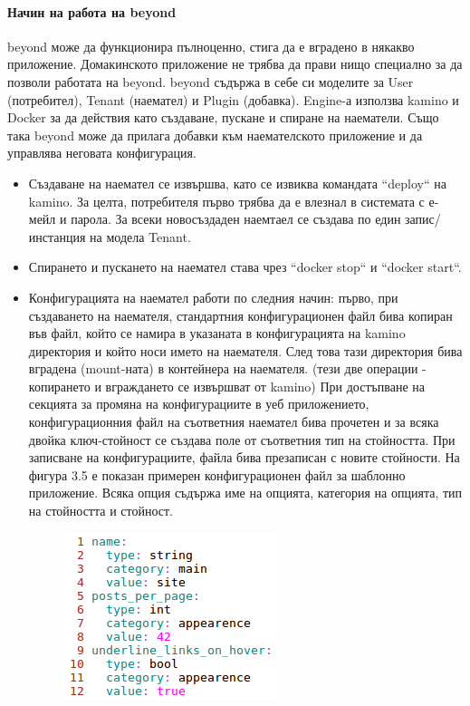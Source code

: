 \documentclass[pdftex,14pt,a4paper]{extreport}
\begin{document}
\paragraph {Начин на работа на beyond}
beyond може да функционира пълноценно, стига да е вградено в някакво приложение. Домакинското приложение не трябва да прави нищо специално за да позволи работата на beyond. beyond съдържа в себе си моделите за User (потребител), Tenant (наемател) и Plugin (добавка). Engine-а използва kamino и Docker за да действия като създаване, пускане и спиране на наематели. Също така beyond може да прилага добавки към наемателското приложение и да управлява неговата конфигурация.
\begin{itemize}
  \item Създаване на наемател се извършва, като се извиква командата ``deploy`` на kamino. За целта, потребителя първо трябва да е влезнал в системата с е-мейл и парола. За всеки новосъздаден наемтаел се създава по един запис/инстанция на модела Tenant.
  \item Спирането и пускането на наемател става чрез ``docker stop`` и ``docker start``.
  \item Конфигурацията на наемател работи по следния начин: първо, при създаването на наемателя, стандартния конфигурационен файл бива копиран във файл, който се намира в указаната в конфигурацията на kamino директория и който носи името на наемателя. След това тази директория бива вградена (mount-ната) в контейнера на наемателя. (тези две операции - копирането и вграждането се извършват от kamino) При достъпване на секцията за промяна на конфигурациите в уеб приложението, конфигурационния файл на съответния наемател бива прочетен и за всяка двойка ключ-стойност се създава поле от съответния тип на стойността. При записване на конфигурациите, файла бива презаписан с новите стойности. На фигура 3.5 е показан примерен конфигурационен файл за шаблонно приложение. Всяка опция съдържа име на опцията, категория на опцията, тип на стойността и стойност.
  \begin{figure}[h]
    \centering
    \includegraphics[scale=0.8]{./snippets/tenant_config}

\end{figure}
\end{itemize}
\end{document}
